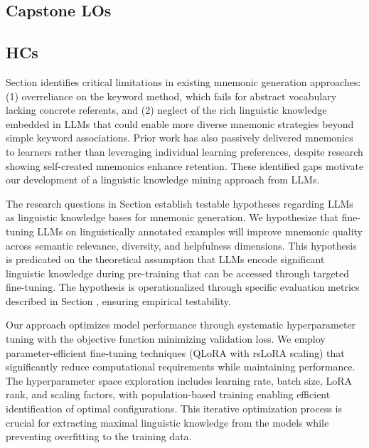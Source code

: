 \subsection{Capstone LOs} \label{sec:capstone-los}

\subsection{HCs} \label{sec:hcs}
 Section  identifies critical limitations in existing mnemonic generation approaches: (1) overreliance on the keyword method, which fails for abstract vocabulary lacking concrete referents, and (2) neglect of the rich linguistic knowledge embedded in LLMs that could enable more diverse mnemonic strategies beyond simple keyword associations. Prior work has also passively delivered mnemonics to learners rather than leveraging individual learning preferences, despite research showing self-created mnemonics enhance retention. These identified gaps motivate our development of a linguistic knowledge mining approach from LLMs.

 The research questions in Section  establish testable hypotheses regarding LLMs as linguistic knowledge bases for mnemonic generation. We hypothesize that fine-tuning LLMs on linguistically annotated examples will improve mnemonic quality across semantic relevance, diversity, and helpfulness dimensions. This hypothesis is predicated on the theoretical assumption that LLMs encode significant linguistic knowledge during pre-training that can be accessed through targeted fine-tuning. The hypothesis is operationalized through specific evaluation metrics described in Section , ensuring empirical testability.

 Our approach optimizes model performance through systematic hyperparameter tuning with the objective function minimizing validation loss. We employ parameter-efficient fine-tuning techniques (QLoRA with rsLoRA scaling) that significantly reduce computational requirements while maintaining performance. The hyperparameter space exploration includes learning rate, batch size, LoRA rank, and scaling factors, with population-based training enabling efficient identification of optimal configurations. This iterative optimization process is crucial for extracting maximal linguistic knowledge from the models while preventing overfitting to the training data.

